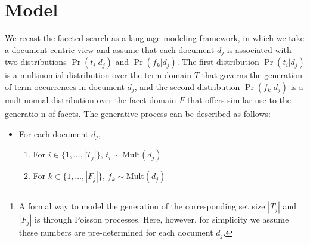 % 
% 
% 

\section{Model}


We recast the faceted search as a language modeling framework, in which we take
a document-centric view and assume that each document $d_j$ is associated with
two distributions $\Pr(t_i|d_j)$ and $\Pr(f_k|d_j)$.  The first distribution
$\Pr(t_i|d_j)$ is a multinomial distribution over the term domain $T$ that
governs the generation of term occurrences in document $d_j$, and the second
distribution $\Pr(f_k|d_j)$ is a multinomial distribution over the facet domain
$F$ that offers similar use to the generatio n of facets.  The generative
process can be described as follows: \footnote{A formal way to model the
generation of the corresponding set size $|T_j|$ and $|F_j|$ is through Poisson
processes.  Here, however, for simplicity we assume these numbers are
pre-determined for each document $d_j$.} 

\begin{itemize} \item For each document $d_j$, \begin{enumerate} \item For $i
\in \{ 1, \ldots, |T_j| \}$, $t_i \sim \textrm{Mult}(d_j)$ \item For $k \in \{
  1, \ldots, |F_j| \}$, $f_k \sim \textrm{Mult}(d_j)$ \end{enumerate}
  \end{itemize}

